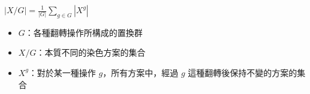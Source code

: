 $|X/G| = \frac{1}{|G|} \sum_{g\in G} |X^g|$
\begin{itemize}
    \item $G$：各種翻轉操作所構成的置換群
    \item $X/G$：本質不同的染色方案的集合
    \item $X^g$：對於某一種操作 $g$，所有方案中，經過 $g$ 這種翻轉後保持不變的方案的集合
\end{itemize}
